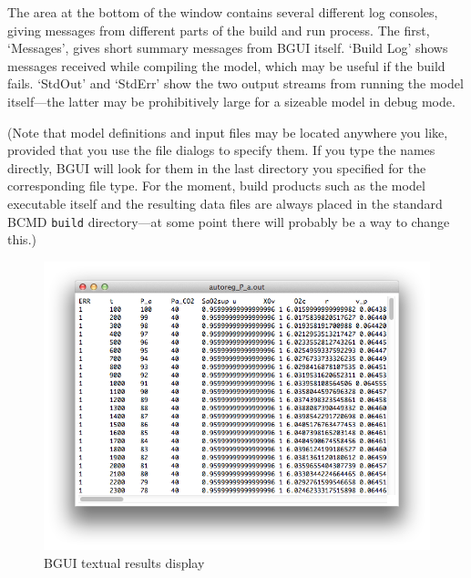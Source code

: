 \documentclass[a4paper,11pt]{article}
\begin{document}
The area at the bottom of the window contains several different log consoles, giving messages from different parts of the build and run process. The first, `Messages', gives short summary messages from BGUI itself. `Build Log' shows messages received while compiling the model, which may be useful if the build fails. `StdOut' and `StdErr' show the two output streams from running the model itself---the latter may be prohibitively large for a sizeable model in debug mode.

(Note that model definitions and input files may be located anywhere you like, provided that you use the file dialogs to specify them. If you type the names directly, BGUI will look for them in the last directory you specified for the corresponding file type. For the moment, build products such as the model executable itself and the resulting data files are always placed in the standard BCMD \texttt{build} directory---at some point there will probably be a way to change this.)

\begin{figure}[tbph]
\begin{center}
\includegraphics[scale=0.5]{figures/textout.png}
\caption{BGUI textual results display}
\label{fig:bgui:text}
\end{center}
\end{figure}
\end{document}
